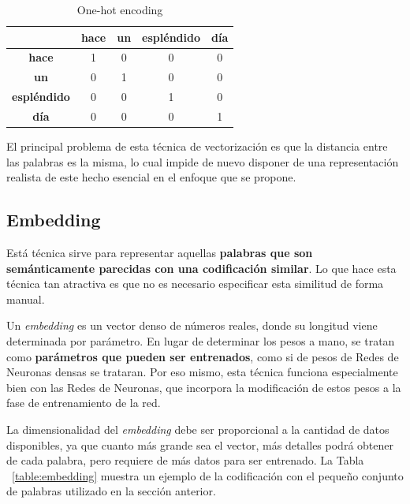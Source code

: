 \documentclass[12pt,a4paper, xcolor=table]{article}
\begin{document}
\newpage

  \begin{table}[!h]
        \centering
        \begin{tabular}{|c|c|c|c|c|}
        \hline
        \textbf{} &\textbf{hace} & \textbf{un} & \textbf{espléndido} & \textbf{día}  \\ \hline
        \textbf{hace}                     & 1 & 0 & 0 & 0\\ \hline
        \textbf{un}                       & 0 & 1 & 0 & 0\\ \hline
        \textbf{espléndido}               & 0 & 0 & 1 & 0\\ \hline
        \textbf{día}                      & 0 & 0 & 0 & 1\\ \hline
        \end{tabular}
        \caption{One-hot encoding}
            \label{table:onehot}
    \end{table}

\vspace{2mm}

El principal problema de esta técnica de vectorización es que la distancia entre las palabras es la misma, lo cual impide de nuevo disponer de una representación realista de este hecho esencial en el enfoque que se propone.

\subsection{Embedding}

Está técnica sirve para representar aquellas \textbf{palabras que son semánticamente parecidas con una codificación similar}. Lo que hace esta técnica tan atractiva es que no es necesario especificar esta similitud de forma manual.

\vspace{2mm}

Un \textit{embedding} es un vector denso de números reales, donde su longitud viene determinada por parámetro. En lugar de determinar los pesos a mano, se tratan como \textbf{parámetros que pueden ser entrenados}, como si de pesos de Redes de Neuronas densas se trataran. Por eso mismo, esta técnica funciona especialmente bien con las Redes de Neuronas, que incorpora la modificación de estos pesos a la fase de entrenamiento de la red.

\vspace{2mm}

La dimensionalidad del \textit{embedding} debe ser proporcional a la cantidad de datos disponibles, ya que cuanto más grande sea el vector, más detalles podrá obtener de cada palabra, pero requiere de más datos para ser entrenado. La Tabla ~\ref{table:embedding} muestra un ejemplo de la codificación con el pequeño conjunto de palabras utilizado en la sección anterior.
\end{document}
